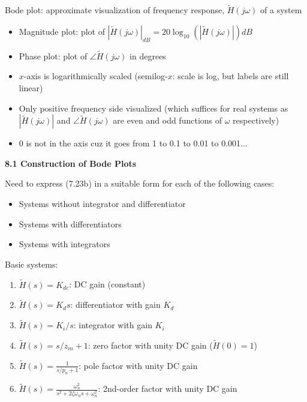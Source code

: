 \documentclass[landscape,a4paper]{extarticle}
\begin{document}
\begin{multicols*}{5}
    Bode plot: approximate visualization of frequency response, $\tilde{H}(j \omega)$ of a system
    \begin{itemize}
        \item Magnitude plot: plot of $\left|\tilde{H}(j \omega)\right|_{dB} = 20 \log_{10}\left(\left|\tilde{H}(j \omega)\right|\right) dB$
        \item Phase plot: plot of $\angle \tilde{H}(j \omega)$ in degrees
        \item $x$-axis is logarithmically scaled (semilog-$x$: scale is log, but labels are still linear)
        \item Only positive frequency side visualized (which suffices for real systems as $|\tilde{H}(j \omega)|$ and $\angle \tilde{H}(j \omega)$ are even and odd functions of $\omega$ respectively)
        \item 0 is not in the axis cuz it goes from 1 to 0.1 to 0.01 to 0.001...
    \end{itemize}

    \textbf{8.1 Construction of Bode Plots}

    Need to express (7.23b) in a suitable form for each of the following cases:
    \begin{itemize}
        \item Systems without integrator and differentiator
        \item Systems with differentiators
        \item Systems with integrators
    \end{itemize}

    Basic systems:
    \begin{enumerate}
        \item $\tilde{H}(s) = K_{dc}$: DC gain (constant)
        \item $\tilde{H}(s) = K_d s$: differentiator with gain $K_d$
        \item $\tilde{H}(s) = K_i/s$: integrator with gain $K_i$
        \item $\tilde{H}(s) = s/z_m + 1$: zero factor with unity DC gain ($\tilde{H}(0) = 1$)
        \item $\tilde{H}(s) = \frac{1}{s/p_n + 1}$: pole factor with unity DC gain
        \item $\tilde{H}(s) = \frac{\omega_n^2}{s^2+2\zeta\omega_ns + \omega_n^2}$: 2nd-order factor with unity DC gain
    \end{enumerate}


\end{multicols*}
\end{document}
